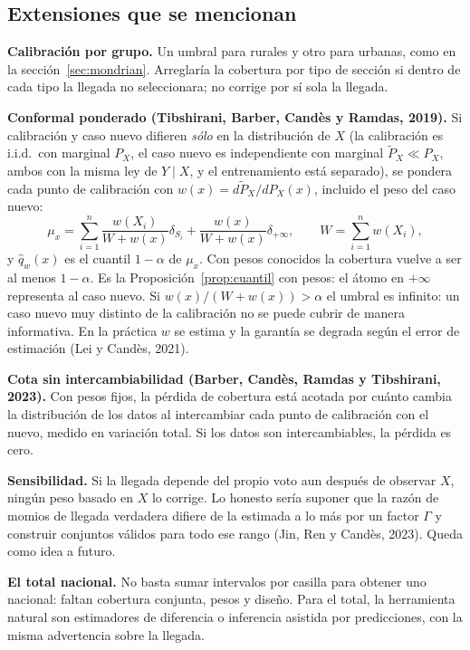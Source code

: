 \documentclass[11pt]{article}
\theoremstyle{plain}
\theoremstyle{definition}
\theoremstyle{remark}
\newcommand{\qhat}{\widehat q}
\newcommand{\dest}[1]{\par\needspace{4\baselineskip}\textbf{#1}\quad}
\begin{document}
\subsection{Extensiones que se mencionan}
\dest{Calibración por grupo.} Un umbral para rurales y otro para urbanas, como en la
sección~\ref{sec:mondrian}. Arreglaría la cobertura por tipo de sección si dentro de cada tipo la
llegada no seleccionara; no corrige por sí sola la llegada.

\dest{Conformal ponderado (Tibshirani, Barber, Candès y Ramdas, 2019).} Si calibración y caso nuevo
difieren \emph{sólo} en la distribución de $X$ (la calibración es i.i.d.\ con marginal $P_X$, el caso
nuevo es independiente con marginal $\widetilde P_X\ll P_X$, ambos con la misma ley de $Y\mid X$, y el
entrenamiento está separado), se pondera cada punto de calibración con
$w(x)=d\widetilde P_X/dP_X(x)$, incluido el peso del caso nuevo:
\[
 \mu_x=\sum_{i=1}^n\frac{w(X_i)}{W+w(x)}\delta_{S_i}+\frac{w(x)}{W+w(x)}\delta_{+\infty},\qquad
 W=\sum_{i=1}^n w(X_i),
\]
y $\qhat_w(x)$ es el cuantil $1-\alpha$ de $\mu_x$. Con pesos conocidos la cobertura vuelve a ser al
menos $1-\alpha$. Es la Proposición~\ref{prop:cuantil} con pesos: el átomo en $+\infty$ representa
al caso nuevo. Si $w(x)/(W+w(x))>\alpha$ el umbral es infinito: un caso nuevo muy distinto de la
calibración no se puede cubrir de manera informativa. En la práctica $w$ se estima y la garantía se
degrada según el error de estimación (Lei y Candès, 2021).

\dest{Cota sin intercambiabilidad (Barber, Candès, Ramdas y Tibshirani, 2023).} Con pesos fijos, la
pérdida de cobertura está acotada por cuánto cambia la distribución de los datos al intercambiar cada
punto de calibración con el nuevo, medido en variación total. Si los datos son intercambiables, la
pérdida es cero.

\dest{Sensibilidad.} Si la llegada depende del propio voto aun después de observar $X$, ningún peso
basado en $X$ lo corrige. Lo honesto sería suponer que la razón de momios de llegada verdadera
difiere de la estimada a lo más por un factor $\Gamma$ y construir conjuntos válidos para todo ese
rango (Jin, Ren y Candès, 2023). Queda como idea a futuro.

\dest{El total nacional.} No basta sumar intervalos por casilla para obtener uno nacional: faltan
cobertura conjunta, pesos y diseño. Para el total, la herramienta natural son estimadores de
diferencia o inferencia asistida por predicciones, con la misma advertencia sobre la llegada.
\end{document}

